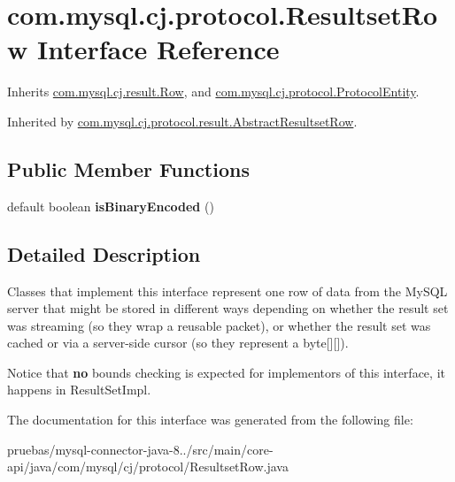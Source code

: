 \hypertarget{interfacecom_1_1mysql_1_1cj_1_1protocol_1_1_resultset_row}{}\section{com.\+mysql.\+cj.\+protocol.\+Resultset\+Row Interface Reference}
\label{interfacecom_1_1mysql_1_1cj_1_1protocol_1_1_resultset_row}


Inherits \mbox{\hyperlink{interfacecom_1_1mysql_1_1cj_1_1result_1_1_row}{com.\+mysql.\+cj.\+result.\+Row}}, and \mbox{\hyperlink{interfacecom_1_1mysql_1_1cj_1_1protocol_1_1_protocol_entity}{com.\+mysql.\+cj.\+protocol.\+Protocol\+Entity}}.



Inherited by \mbox{\hyperlink{classcom_1_1mysql_1_1cj_1_1protocol_1_1result_1_1_abstract_resultset_row}{com.\+mysql.\+cj.\+protocol.\+result.\+Abstract\+Resultset\+Row}}.

\subsection*{Public Member Functions}
\begin{DoxyCompactItemize}
\item 
\mbox{\label{interfacecom_1_1mysql_1_1cj_1_1protocol_1_1_resultset_row_a7460706550d3aea6a340ff6676bd7062}} 
default boolean {\bfseries is\+Binary\+Encoded} ()
\end{DoxyCompactItemize}


\subsection{Detailed Description}
Classes that implement this interface represent one row of data from the My\+S\+QL server that might be stored in different ways depending on whether the result set was streaming (so they wrap a reusable packet), or whether the result set was cached or via a server-\/side cursor (so they represent a byte\mbox{[}\mbox{]}\mbox{[}\mbox{]}).

Notice that {\bfseries no} bounds checking is expected for implementors of this interface, it happens in Result\+Set\+Impl. 

The documentation for this interface was generated from the following file\+:\begin{DoxyCompactItemize}
\item 
pruebas/mysql-\/connector-\/java-\/8../src/main/core-\/api/java/com/mysql/cj/protocol/Resultset\+Row.\+java\end{DoxyCompactItemize}
